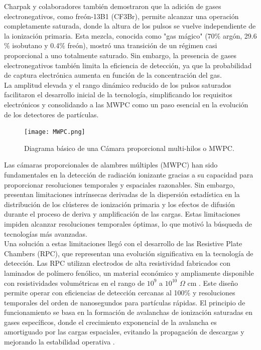 \documentclass{article}
\begin{document}
\noindent Charpak y colaboradores \cite{charpak1974high} también demostraron que la adición de gases electronegativos, como freón-13B1 (CF3Br), permite alcanzar una operación completamente saturada, donde la altura de los pulsos se vuelve independiente de la ionización primaria. Esta mezcla, conocida como "gas mágico" (70$\%$ argón, 29.6$\%$ isobutano y 0.4$\%$ freón), mostró una transición de un régimen casi proporcional a uno totalmente saturado. Sin embargo, la presencia de gases electronegativos también limita la eficiencia de detección, ya que la probabilidad de captura electrónica aumenta en función de la concentración del gas.\\

\noindent La amplitud elevada y el rango dinámico reducido de los pulsos saturados facilitaron el desarrollo inicial de la tecnología, simplificando los requisitos electrónicos y consolidando a las MWPC como un paso esencial en la evolución de los detectores de partículas.\\

\begin{figure}[H]
    \centering
    \texttt{[image: MWPC.png]}
    \caption{Diagrama básico de una Cámara proporcional multi-hilos o MWPC.}
    \label{fig:MWPC}
\end{figure}

\noindent Las cámaras proporcionales de alambres múltiples (MWPC) han sido fundamentales en la detección de radiación ionizante gracias a su capacidad para proporcionar resoluciones temporales y espaciales razonables. Sin embargo, presentan limitaciones intrínsecas derivadas de la dispersión estadística en la distribución de los clústeres de ionización primaria y los efectos de difusión durante el proceso de deriva y amplificación de las cargas. Estas limitaciones impiden alcanzar resoluciones temporales óptimas, lo que motivó la búsqueda de tecnologías más avanzadas. \\

\noindent Una solución a estas limitaciones llegó con el desarrollo de las Resistive Plate Chambers (RPC), que representan una evolución significativa en la tecnología de detección. Las RPC utilizan electrodos de alta resistividad fabricados con laminados de polímero fenólico, un material económico y ampliamente disponible con resistividades volumétricas en el rango de $10^9$ a $10^{10}$ $\Omega$ cm \cite{pestov2002review}. Este diseño permite operar con eficiencias de detección cercanas al 100$\%$ y resoluciones temporales del orden de nanosegundos para partículas rápidas. El principio de funcionamiento se basa en la formación de avalanchas de ionización saturadas en gases específicos, donde el crecimiento exponencial de la avalancha es amortiguado por las cargas espaciales, evitando la propagación de descargas y mejorando la estabilidad operativa \cite{pestov2002review}. \\
\end{document}
